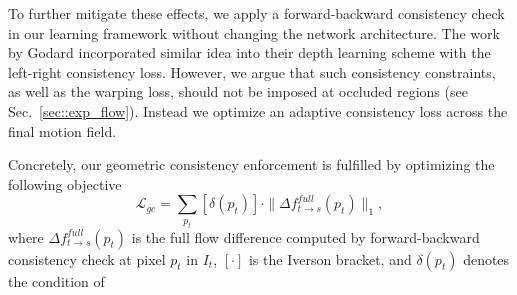 \documentclass[10pt,twocolumn,letterpaper]{article}
\newcommand{\jpshi}[1]{{{\color{blue} Jianping: #1}}}
\begin{document}
To further mitigate these effects, %
we apply a forward-backward consistency check in our learning framework without changing the network architecture. The work by Godard \etal\cite{monodepth17} incorporated similar idea into their depth learning scheme %
with the left-right consistency loss. However, we argue that such consistency constraints, as well as the warping loss, should not be imposed at occluded regions (see Sec.~\ref{sec::exp_flow}). Instead we optimize an adaptive consistency loss across the final motion field.
 
Concretely, our geometric consistency enforcement is fulfilled by optimizing the following objective
\begin{equation}
    \label{equa::cst}
\mathcal{L}_{gc} = \sum_{p_t} [\delta(p_t)]\cdot\|\Delta f_{t\to s}^{full}(p_t)\|_1, 
\end{equation}
where $\Delta f_{t\to s}^{full}(p_t)$ is the full flow difference computed by forward-backward consistency check at pixel $p_t$ in $I_t$, $[\cdot]$ is the Iverson bracket, and $\delta(p_t)$ denotes the condition of  
\end{document}
